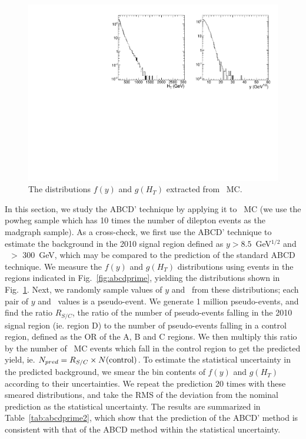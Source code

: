 \begin{figure}[tbh]
\begin{center}
\includegraphics[width=1\linewidth]{plots/abcdprimedist.pdf}
\caption{\label{fig:abcddist}\protect The distributions $f(y)$ and $g(H_T)$ 
extracted from \ttbar\ MC.}
\end{center}
\end{figure}

In this section, we study the ABCD' technique by applying it to \ttbar\ MC (we use the powheg sample which has
10 times the number of dilepton events as the madgraph sample). As a cross-check,
we first use the ABCD' technique to estimate the background in the 2010 signal region
defined as $y > 8.5$~GeV$^{1/2}$ and \Ht\ $>$ 300~GeV, which may be compared to the 
prediction of the standard ABCD technique. We measure the $f(y)$ and $g(H_T)$ distributions
using events in the regions indicated in Fig.~\ref{fig:abcdprime}, yielding the
distributions shown in Fig.~\ref{fig:abcddist}. Next, we randomly sample values of $y$
and \Ht\ from these distributions; each pair of $y$ and \Ht\ values is a pseudo-event.
We generate 1 million pseudo-events, and find the ratio $R_{S/C}$, the ratio of the
number of pseudo-events falling in the 2010 signal region (ie. region D) to the number of pseudo-events
falling in a control region, defined as the OR of the A, B and C regions. We then
multiply this ratio by the number of \ttbar\ MC events which fall in the control region
to get the predicted yield, ie. $N_{pred} = R_{S/C} \times N({\rm control})$. 
To estimate the statistical uncertainty in the predicted background, we smear the bin contents
of $f(y)$ and $g(H_T)$ according to their uncertainties. We repeat the prediction 20 times
with these smeared distributions, and take the RMS of the deviation from the nominal prediction
as the statistical uncertainty. The results
are summarized in Table~\ref{tab:abcdprime2}, which show that the prediction of the
ABCD' method is consistent with that of the ABCD method within the statistical uncertainty.

